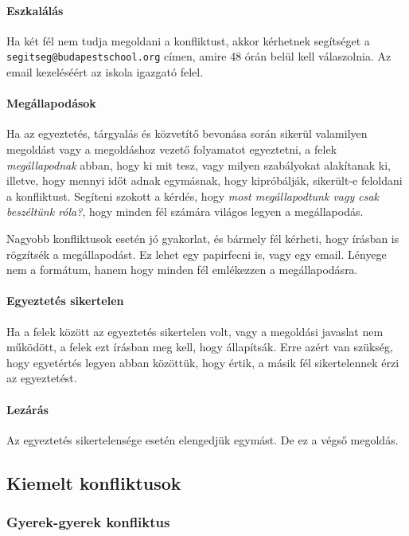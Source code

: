 \paragraph{Eszkalálás}

Ha két fél nem tudja megoldani a konfliktust, akkor kérhetnek segítséget a
\texttt{segitseg@budapestschool.org}
címen, amire 48 órán belül kell válaszolnia. Az email kezeléséért az iskola
igazgató felel.

\paragraph{Megállapodások}

Ha az egyeztetés, tárgyalás és közvetítő bevonása során sikerül
valamilyen megoldást vagy a megoldáshoz vezető folyamatot egyeztetni, a
felek \emph{megállapodnak} abban, hogy ki mit tesz, vagy milyen szabályokat
alakítanak
ki, illetve, hogy mennyi időt adnak egymásnak, hogy kipróbálják, sikerült-e
feloldani a konfliktust.
Segíteni szokott a kérdés, hogy \emph{most megállapodtunk vagy csak beszéltünk
      róla?}, hogy minden fél számára világos legyen a megállapodás.

Nagyobb konfliktusok esetén jó gyakorlat, és bármely fél kérheti, hogy
írásban is rögzítsék a megállapodást. Ez lehet egy papirfecni is, vagy egy
email. Lényege nem a formátum, hanem  hogy minden fél emlékezzen a
megállapodásra.

\paragraph{Egyeztetés sikertelen}

Ha a felek között az egyeztetés sikertelen volt, vagy a megoldási
javaslat nem működött, a felek ezt írásban meg kell, hogy állapítsák. Erre
azért van szükség, hogy egyetértés legyen abban közöttük, hogy értik, a
másik fél sikertelennek érzi az egyeztetést.

\paragraph{Lezárás}

Az egyeztetés sikertelensége esetén elengedjük egymást. De ez a végső
megoldás.

\subsection{Kiemelt konfliktusok}

\subsubsection{Gyerek-gyerek
      konfliktus}

